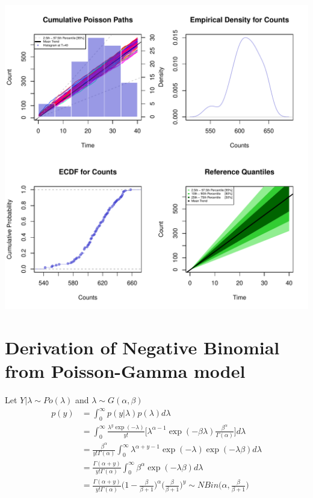 \begin{knitrout}
{\centering \includegraphics[width=\textwidth-3cm]{figure/ch02_figunnamed-chunk-5-1} 

}


\end{knitrout}



\section{Derivation of Negative Binomial from Poisson-Gamma model}

Let $Y|\lambda \sim Po(\lambda)$ and $\lambda \sim G(\alpha,\beta)$
\begin{align*}
p(y)&=\int^\infty_0 p(y|\lambda) p(\lambda) d\lambda\\
&=\int^\infty_0 \frac{\lambda^y\exp(-\lambda)}{y!}\Bigg[\lambda^{\alpha-1}\exp(-\beta\lambda)\frac{\beta^\alpha}{\Gamma(\alpha)}\Bigg]d\lambda\\
&=\frac{\beta^\alpha}{y!\Gamma(\alpha)}\int^\infty_0 \lambda^{\alpha+y-1}\exp(-\lambda)\exp(-\lambda\beta)d\lambda\\
&=\frac{\Gamma(\alpha+y)}{y!\Gamma(\alpha)}\int^\infty_0 \beta^\alpha \exp(-\lambda\beta)d\lambda\\
&=\frac{\Gamma(\alpha+y)}{y!\Gamma(\alpha)}\Bigg(1-\frac{\beta}{\beta+1}\Bigg)^{\alpha}\Bigg(\frac{\beta}{\beta+1}\Bigg)^y \sim NBin \Bigg(\alpha, \frac{\beta}{\beta+1}\Bigg)
\end{align*}

